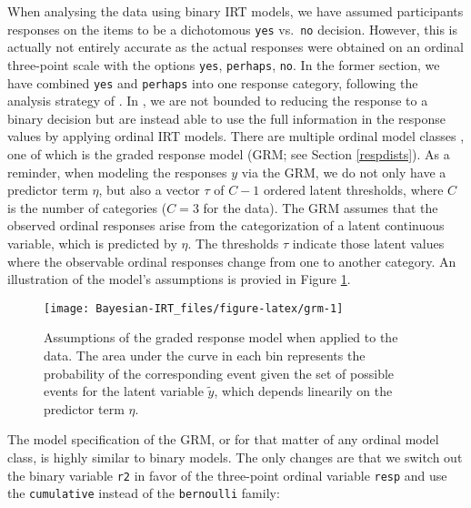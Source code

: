 \documentclass[jss]{jss}
\begin{document}
When analysing the  data using binary IRT models, we have
assumed participants responses on the items to be a dichotomous
\texttt{yes} vs.~\texttt{no} decision. However, this is actually not
entirely accurate as the actual responses were obtained on an ordinal
three-point scale with the options \texttt{yes}, \texttt{perhaps},
\texttt{no}. In the former section, we have combined \texttt{yes} and
\texttt{perhaps} into one response category, following the analysis
strategy of \citet{deboeck2011}. In , we are not bounded to
reducing the response to a binary decision but are instead able to use
the full information in the response values by applying ordinal IRT
models. There are multiple ordinal model classes
\citep{agresti2010, buerkner2019}, one of which is the graded response
model (GRM; see Section \ref{respdists}). As a reminder, when modeling
the responses \(y\) via the GRM, we do not only have a predictor term
\(\eta\), but also a vector \(\tau\) of \(C-1\) ordered latent
thresholds, where \(C\) is the number of categories (\(C = 3\) for the
 data). The GRM assumes that the observed ordinal
responses arise from the categorization of a latent continuous variable,
which is predicted by \(\eta\). The thresholds \(\tau\) indicate those
latent values where the observable ordinal responses change from one to
another category. An illustration of the model's assumptions is provied
in Figure \ref{fig:grm}.

\begin{CodeChunk}
\begin{figure}

{\centering \texttt{[image: Bayesian-IRT\_files/figure-latex/grm-1]} 

}

\caption{Assumptions of the graded response model when applied to the  data. The area under the curve in each bin represents the probability of the corresponding event given the set of possible events for the latent variable $\tilde{y}$, which depends linearily on the predictor term $\eta$.}\label{fig:grm}
\end{figure}
\end{CodeChunk}

The model specification of the GRM, or for that matter of any ordinal
model class, is highly similar to binary models. The only changes are
that we switch out the binary variable \texttt{r2} in favor of the
three-point ordinal variable \texttt{resp} and use the
\texttt{cumulative} instead of the \texttt{bernoulli} family:
\end{document}
